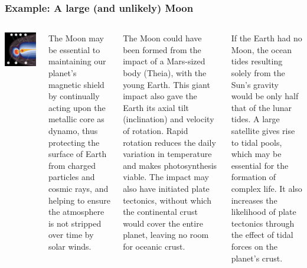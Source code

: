 \begin{frame}
\frametitle{Example: A large (and unlikely) Moon}

\begin{columns}

\includegraphics[scale=0.25]{magnetosphere}

The Moon may be essential to maintaining our planet's magnetic shield by continually acting upon the metallic core as dynamo, thus protecting the surface of Earth from charged particles and cosmic rays, and helping to ensure the atmosphere is not stripped over time by solar winds.

The Moon could have been formed from the impact of a Mars-sized body (Theia), with the young Earth. This giant impact also gave the Earth its axial tilt (inclination) and velocity of rotation. Rapid rotation reduces the daily variation in temperature and makes photosynthesis viable. The impact may also have initiated plate tectonics, without which the continental crust would cover the entire planet, leaving no room for oceanic crust.

If the Earth had no Moon, the ocean tides resulting solely from the Sun's gravity would be only half that of the lunar tides. A large satellite gives rise to tidal pools, which may be essential for the formation of complex life.
It also increases the likelihood of plate tectonics through the effect of tidal forces on the planet's crust.
\end{columns}
\end{frame}


